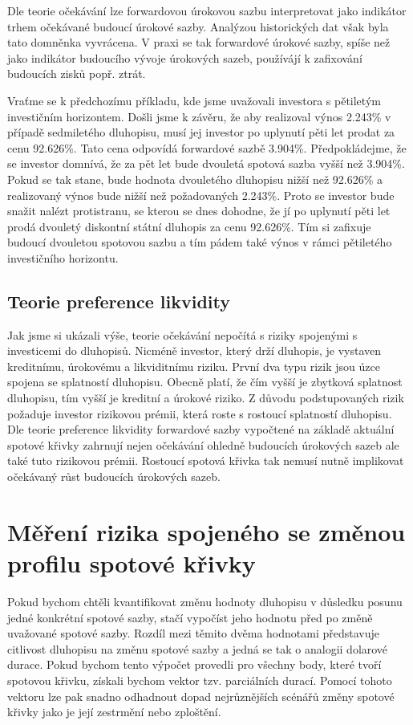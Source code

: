 \documentclass[a4paper]{book}
\begin{document}
Dle teorie očekávání lze forwardovou úrokovou sazbu interpretovat jako indikátor trhem očekávané budoucí úrokové sazby. Analýzou historických dat však byla tato domněnka vyvrácena. V praxi se tak forwardové úrokové sazby, spíše než jako indikátor budoucího vývoje úrokových sazeb, používájí k zafixování budoucích zisků popř. ztrát.

Vraťme se k předchozímu příkladu, kde jsme uvažovali investora s pětiletým investičním horizontem. Došli jsme k závěru, že aby realizoval výnos 2.243\% v případě sedmiletého dluhopisu, musí jej investor po uplynutí pěti let prodat za cenu 92.626\%. Tato cena odpovídá forwardové sazbě 3.904\%. Předpokládejme, že se investor domnívá, že za pět let bude dvouletá spotová sazba vyšší než 3.904\%. Pokud se tak stane, bude hodnota dvouletého dluhopisu nižší než 92.626\% a realizovaný výnos bude nižší než požadovaných 2.243\%. Proto se investor bude snažit nalézt protistranu, se kterou se dnes dohodne, že jí po uplynutí pěti let prodá dvouletý diskontní státní dluhopis za cenu 92.626\%. Tím si zafixuje budoucí dvouletou spotovou sazbu a tím pádem také výnos v rámci pětiletého investičního horizontu.

\subsection{Teorie preference likvidity}

Jak jsme si ukázali výše, teorie očekávání nepočítá s riziky spojenými s investicemi do dluhopisů. Nicméně investor, který drží dluhopis, je vystaven kreditnímu, úrokovému a likviditnímu riziku. První dva typu rizik jsou úzce spojena se splatností dluhopisu. Obecně platí, že čím vyšší je zbytková splatnost dluhopisu, tím vyšší je kreditní a úrokové riziko. Z důvodu podstupovaných rizik požaduje investor rizikovou prémii, která roste s rostoucí splatností dluhopisu. Dle teorie preference likvidity forwardové sazby vypočtené na základě aktuální spotové křivky zahrnují nejen očekávání ohledně budoucích úrokových sazeb ale také tuto rizikovou prémii. Rostoucí spotová křivka tak nemusí nutně implikovat očekávaný růst budoucích úrokových sazeb.

\section{Měření rizika spojeného se změnou profilu spotové křivky}

Pokud bychom chtěli kvantifikovat změnu hodnoty dluhopisu v důsledku posunu jedné konkrétní spotové sazby, stačí vypočíst jeho hodnotu před po změně uvažované spotové sazby. Rozdíl mezi těmito dvěma hodnotami představuje citlivost dluhopisu na změnu spotové sazby a jedná se tak o analogii dolarové durace. Pokud bychom tento výpočet provedli pro všechny body, které tvoří spotovou křivku, získali bychom vektor tzv. parciálních durací. Pomocí tohoto vektoru lze pak snadno odhadnout dopad nejrůznějších scénářů změny spotové křivky jako je její zestrmění nebo zploštění.
\end{document}
